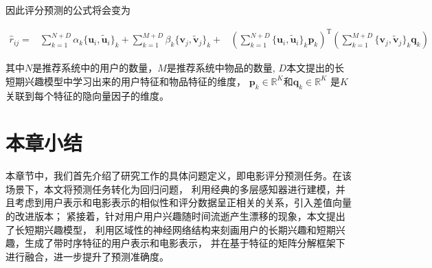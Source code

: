 因此评分预测的公式将会变为

\begin{equation}
\begin{aligned}
\hat{r}_{ij} =
&\sum_{k=1}^{N+D} \alpha_k \{ \mathbf{u}_i , \tilde{\mathbf{u}}_i \}_k +
\sum_{k=1}^{M+D} \beta_k  \{ \mathbf{v}_j , \tilde{\mathbf{v}}_j \}_k + 
&\left( \sum_{k=1}^{N+D} \{ \mathbf{u}_i , \tilde{\mathbf{u}}_i \}_k \mathbf{p}_k \right) ^ \mathrm{T}
\left( \sum_{k=1}^{M+D} \{ \mathbf{v}_j , \tilde{\mathbf{v}}_j \}_k \mathbf{q}_k \right)
\end{aligned}
\end{equation}

其中$N$是推荐系统中的用户的数量，$M$是推荐系统中物品的数量,
$D$本文提出的长短期兴趣模型中学习出来的用户特征和物品特征的维度，
$\mathbf{p}_{k} \in \mathbb{R}^K$和$\mathbf{q}_{k} \in \mathbb{R}^K$
是$K$关联到每个特征的隐向量因子的维度。

\section{本章小结}
本章节中，我们首先介绍了研究工作的具体问题定义，即电影评分预测任务。在该场景下，本文将预测任务转化为回归问题，
利用经典的多层感知器进行建模，并且考虑到用户表示和电影表示的相似性和评分数据呈正相关的关系，引入差值向量的改进版本；
紧接着，针对用户用户兴趣随时间流逝产生漂移的现象，本文提出了长短期兴趣模型，
利用区域性的神经网络结构来刻画用户的长期兴趣和短期兴趣，生成了带时序特征的用户表示和电影表示，
并在基于特征的矩阵分解框架下进行融合，进一步提升了预测准确度。


